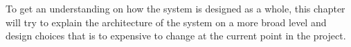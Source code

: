 
To get an understanding on how the system is designed as a whole, this chapter will try to explain the architecture of the system on a more broad level and design choices that is to expensive to change at the current point in the project.





